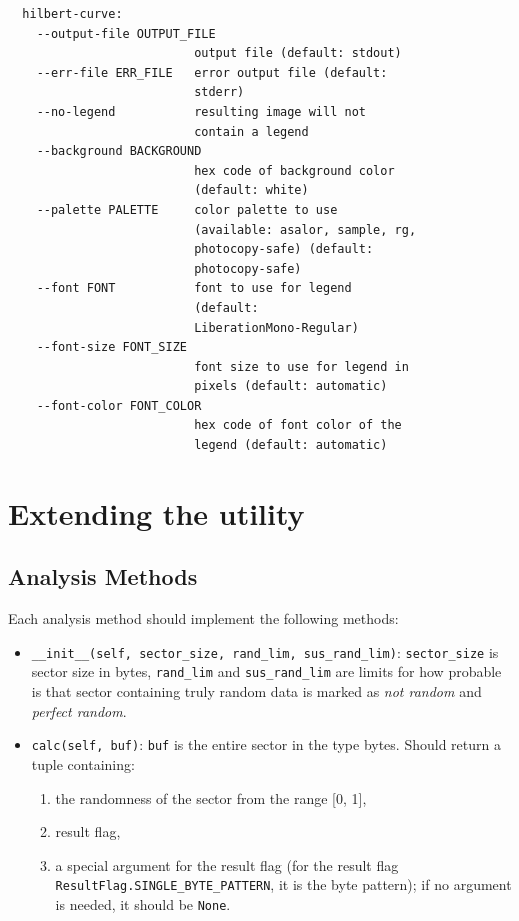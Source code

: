 \documentclass[
  digital, %
  color,   %
  oneside, %
  lof,     %
  nolot,     %
]{fithesis4}
\begin{document}
\begin{verbatim}
  hilbert-curve:
    --output-file OUTPUT_FILE
                          output file (default: stdout)
    --err-file ERR_FILE   error output file (default:
                          stderr)
    --no-legend           resulting image will not
                          contain a legend
    --background BACKGROUND
                          hex code of background color
                          (default: white)
    --palette PALETTE     color palette to use
                          (available: asalor, sample, rg,
                          photocopy-safe) (default:
                          photocopy-safe)
    --font FONT           font to use for legend
                          (default:
                          LiberationMono-Regular)
    --font-size FONT_SIZE
                          font size to use for legend in
                          pixels (default: automatic)
    --font-color FONT_COLOR
                          hex code of font color of the
                          legend (default: automatic)
\end{verbatim}

\chapter{Extending the utility}
\section{Analysis Methods}

Each analysis method should implement the following methods:
\begin{itemize}
  \item \texttt{\_\_init\_\_(self, sector\_size, rand\_lim, sus\_rand\_lim)}: \texttt{sector\_size} is sector size in bytes, \texttt{rand\_lim} and \texttt{sus\_rand\_lim} are limits for how probable is that sector containing truly random data is marked as \emph{not random} and \emph{perfect random}.
  \item \texttt{calc(self, buf)}: \texttt{buf} is the entire sector in the type bytes.
    Should return a tuple containing:
    \begin{enumerate}
      \item the randomness of the sector from the range [0, 1],
      \item result flag,
      \item a special argument for the result flag (for the result flag \texttt{ResultFlag.SINGLE\_BYTE\_PATTERN}, it is the byte pattern); if no argument is needed, it should be \texttt{None}.
    \end{enumerate}
\end{itemize}
\end{document}
